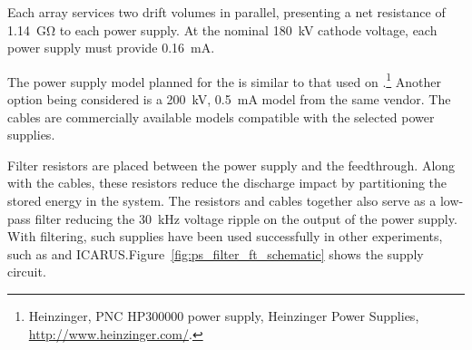 Each  array 
services two drift volumes in parallel, 
presenting a net resistance of \SI{1.14}{\giga\ohm} to each power supply. At the nominal \SI{180}{kV} cathode voltage, each power supply must provide \SI{0.16}{mA}.

The power supply model planned for the  is similar to that used on .\footnote{Heinzinger, PNC HP300000  power supply, Heinzinger\texttrademark{} Power Supplies, \url{http://www.heinzinger.com/}.}  %
Another %
option being considered is a \SI{200}{kV}, \SI{0.5}{mA} model from the same vendor. 
The  cables are commercially available models compatible with the selected power supplies. 


Filter resistors  are placed between the power supply and the feedthrough.  Along with the cables, these resistors reduce the discharge impact by partitioning the stored energy in the system.  The resistors and cables together also serve as a low-pass filter reducing 
the \SI{30}{kHz} voltage ripple on the output of the power supply.  With filtering, such supplies have been used successfully in other \lartpc experiments, such as \microboone and ICARUS.Figure~\ref{fig:ps_filter_ft_schematic} shows the  supply circuit.

